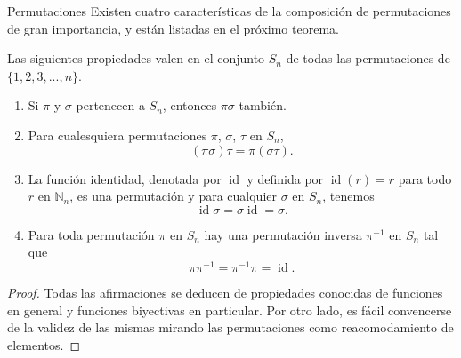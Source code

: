 \begin{section}{Permutaciones}
Existen cuatro características de la composición de permutaciones de gran importancia, y están listadas en el próximo teorema.

\begin{teorema}\label{tA3} Las siguientes propiedades valen en el conjunto $S_n$ de todas las permutaciones de $\{1,2,3,...,n\}$.
\begin{enumerate}[label=\textit{\alph*)}]
\item  Si $\pi$ y $\sigma$ pertenecen a $S_n$, entonces $\pi\sigma$ también.
\item  Para cualesquiera permutaciones $\pi$, $\sigma$, $\tau$ en $S_n$,
$$
(\pi\sigma)\tau=\pi(\sigma\tau).$$
\item  La función identidad, denotada por $\operatorname{id}$ y definida por $\operatorname{id}(r) =r$ para todo $r$ en $\mathbb N_n$, es una permutación y para cualquier $\sigma$ en $S_n$,
tenemos
$$
\operatorname{id}\sigma=\sigma\operatorname{id}=\sigma.$$
\item  Para toda permutación $\pi$ en $S_n$ hay una permutación inversa $\pi^{-1}$ en $S_n$ tal que
$$
\pi\pi^{-1} = \pi^{-1}\pi = \operatorname{id}.
$$
\end{enumerate}
\end{teorema}
\begin{proof} Todas las afirmaciones se deducen de propiedades conocidas de funciones en general y funciones biyectivas en particular. Por otro lado, es fácil convencerse de la validez de las mismas mirando las permutaciones como reacomodamiento de elementos. 
\end{proof}



\end{section}

